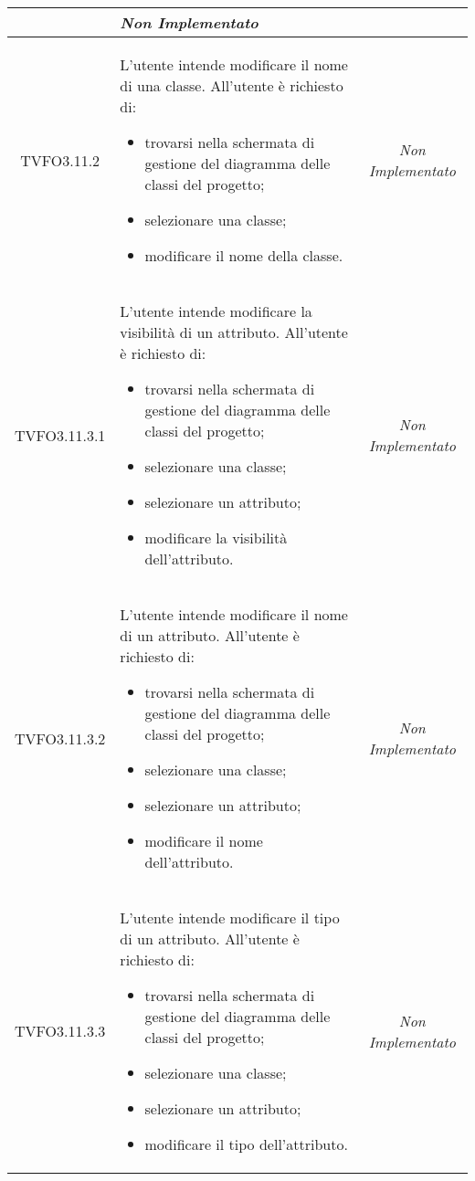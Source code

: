 \begin{longtable}{|c|>{}m{8cm}|c|}
\begin{itemize}
\end{itemize} & \textit{Non Implementato}\\ \hline
\hypertarget{TVFO3.11.2}{TVFO3.11.2} & L'utente intende modificare il nome di una classe.
All'utente è richiesto di:
\begin{itemize}
\item trovarsi nella schermata di gestione del diagramma delle classi del progetto;
\item selezionare una classe;
\item modificare il nome della classe.
\end{itemize} & \textit{Non Implementato}\\ \hline
\hypertarget{TVFO3.11.3.1}{TVFO3.11.3.1} & L'utente intende modificare la visibilità di un attributo.
All'utente è richiesto di:
\begin{itemize}
\item trovarsi nella schermata di gestione del diagramma delle classi del progetto;
\item selezionare una classe;
\item selezionare un attributo;
\item modificare la visibilità dell'attributo.
\end{itemize} & \textit{Non Implementato}\\ \hline
\hypertarget{TVFO3.11.3.2}{TVFO3.11.3.2} & L'utente intende modificare il nome di un attributo.
All'utente è richiesto di:
\begin{itemize}
\item trovarsi nella schermata di gestione del diagramma delle classi del progetto;
\item selezionare una classe;
\item selezionare un attributo;
\item modificare il nome dell'attributo.
\end{itemize} & \textit{Non Implementato}\\ \hline
\hypertarget{TVFO3.11.3.3}{TVFO3.11.3.3} & L'utente intende modificare il tipo di un attributo.
All'utente è richiesto di:
\begin{itemize}
\item trovarsi nella schermata di gestione del diagramma delle classi del progetto;
\item selezionare una classe;
\item selezionare un attributo;
\item modificare il tipo dell'attributo.
\end{itemize} & \textit{Non Implementato}\\ \hline

\end{longtable}
